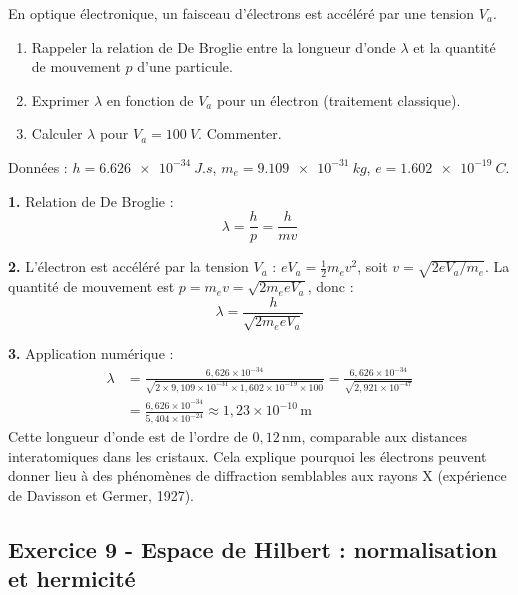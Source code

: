 \documentclass[12pt,a4paper]{article}
\begin{document}
\begin{boiteexercice}
En optique électronique, un faisceau d'électrons est accéléré par une tension $V_a$.
\begin{enumerate}
  \item Rappeler la relation de De Broglie entre la longueur d'onde $\lambda$ et la quantité de mouvement $p$ d'une particule.
  \item Exprimer $\lambda$ en fonction de $V_a$ pour un électron (traitement classique).
  \item Calculer $\lambda$ pour $V_a = \qty{100}{V}$. Commenter.
\end{enumerate}
Données : $h = \qty{6.626e-34}{J.s}$, $m_e = \qty{9.109e-31}{kg}$, $e = \qty{1.602e-19}{C}$.
\end{boiteexercice}

\begin{boitecorrige}
\textbf{1.} Relation de De Broglie :
\[
\lambda = \frac{h}{p} = \frac{h}{mv}
\]

\textbf{2.} L'électron est accéléré par la tension $V_a$ : $eV_a = \frac{1}{2}m_e v^2$, soit $v = \sqrt{2eV_a/m_e}$. La quantité de mouvement est $p = m_e v = \sqrt{2m_e eV_a}$, donc :
\[
\boxed{\lambda = \frac{h}{\sqrt{2m_e eV_a}}}
\]

\textbf{3.} Application numérique :
\begin{align*}
\lambda &= \frac{6{,}626\times10^{-34}}{\sqrt{2\times9{,}109\times10^{-31}\times1{,}602\times10^{-19}\times100}}
         = \frac{6{,}626\times10^{-34}}{\sqrt{2{,}921\times10^{-47}}} \\
        &= \frac{6{,}626\times10^{-34}}{5{,}404\times10^{-24}}
         \approx \boxed{1{,}23\times10^{-10}\,\text{m}}
\end{align*}
Cette longueur d'onde est de l'ordre de $0{,}12\,\text{nm}$, comparable aux distances interatomiques dans les cristaux. Cela explique pourquoi les électrons peuvent donner lieu à des phénomènes de diffraction semblables aux rayons X (expérience de Davisson et Germer, 1927).
\end{boitecorrige}

\subsection*{Exercice 9 - Espace de Hilbert : normalisation et hermicité \niveau{\difficile}}
\end{document}

